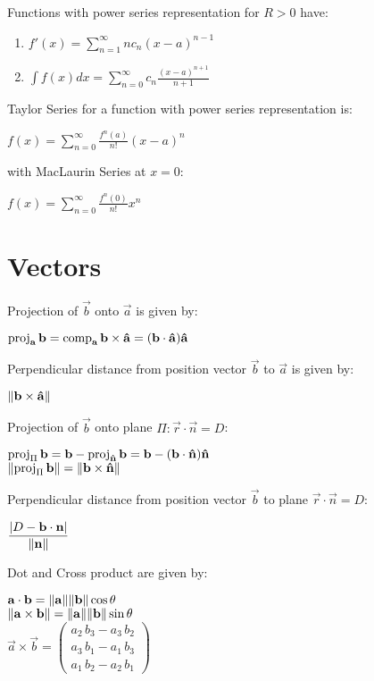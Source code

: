 \documentclass[12pt, a4paper]{article}
\begin{document}
\begin{multicols*}{4}
Functions with power series representation for $R > 0$ have:
\begin{enumerate}[label=\roman*., parsep=-1em]
  \item $\displaystyle f'(x) = \sum^{\infty}_{n=1}nc_n(x-a)^{n-1}$
  \item $\displaystyle \int f(x)dx = \sum^{\infty}_{n=0}c_n\frac{(x-a)^{n+1}}{n+1}$
\end{enumerate}

Taylor Series for a function with power series representation is:\\
{\centering
  $\displaystyle f(x) = \sum^{\infty}_{n=0}\frac{f^n(a)}{n!}(x-a)^n$
\par}
\vspace{-0.5em}
with MacLaurin Series at $x=0$:\\
{\centering
  $\displaystyle f(x) = \sum^{\infty}_{n=0}\frac{f^n(0)}{n!}x^n$
\par}

\section{Vectors}
Projection of $\vec{b}$ onto $\vec{a}$ is given by:\\
{\centering
  $\displaystyle \operatorname{proj}_{\mathbf{a}}\mathbf{b} = \operatorname{comp}_{\mathbf{a}}\mathbf{b} \times \mathbf{\hat{a}} = (\mathbf{b} \cdot \mathbf{\hat{a}}) \mathbf{\hat{a}}$
\par}

Perpendicular distance from position vector $\vec{b}$ to $\vec{a}$ is given by:\\
{\centering
  $\displaystyle \lVert\mathbf{b} \times \mathbf{\hat{a}}\rVert$
\par}

Projection of $\vec{b}$ onto plane $\Pi: \vec{r} \cdot \vec{n} = D$:\\
{\centering
  $\displaystyle \operatorname{proj}_{\Pi}\mathbf{b} = \mathbf{b} - \operatorname{proj}_{\mathbf{\hat{n}}}\mathbf{b} = \mathbf{b} - (\mathbf{b} \cdot \mathbf{\hat{n}})\mathbf{\hat{n}}$\\
  $\displaystyle \lVert\operatorname{proj}_{\Pi}\mathbf{b}\rVert = \lVert\mathbf{b} \times \mathbf{\hat{n}}\rVert$
\par}

Perpendicular distance from position vector $\vec{b}$ to plane $\vec{r} \cdot \vec{n} = D$:\\
{\centering
  $\displaystyle \frac{|D - \mathbf{b}\cdot \mathbf{n}|}{\lVert\mathbf{n}\rVert}$
\par}

Dot and Cross product are given by:\\
{\centering
  $\mathbf{a} \cdot \mathbf{b} = \lVert\mathbf{a}\rVert\lVert\mathbf{b}\rVert\cos\theta$\\
  $\lVert\mathbf{a}\times \mathbf{b}\rVert = \lVert\mathbf{a}\rVert\lVert\mathbf{b}\rVert\sin\theta$\\
  $\vec{a} \times \vec{b} = \left(\begin{array}{c} a_{2}\,b_{3}-a_{3}\,b_{2}\\ a_{3}\,b_{1}-a_{1}\,b_{3}\\ a_{1}\,b_{2}-a_{2}\,b_{1} \end{array}\right)$
\par}


\end{multicols*}
\end{document}
